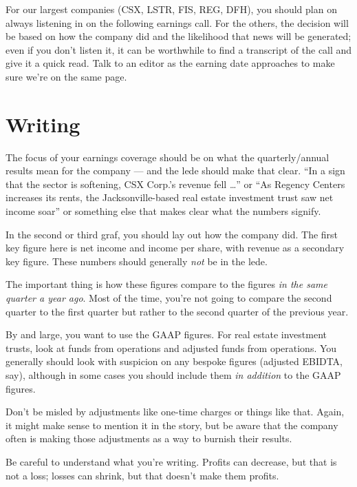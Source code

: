 \documentclass[
  11pt,
  american,
  letterpaperpaper,
  extrafontsizes,onecolumn,openright
  ]{memoir}
\begin{document}
For our largest companies (CSX, LSTR, FIS, REG, DFH), you should plan on always listening in on the following earnings call. For the others, the decision will be based on how the company did and the likelihood that news will be generated; even if you don't listen it, it can be worthwhile to find a transcript of the call and give it a quick read. Talk to an editor as the earning date approaches to make sure we're on the same page.

\hypertarget{writing}{%
\section*{Writing}\label{writing}}

The focus of your earnings coverage should be on what the quarterly/annual results mean for the company --- and the lede should make that clear. \enquote{In a sign that the sector is softening, CSX Corp.'s revenue fell \ldots{}} or \enquote{As Regency Centers increases its rents, the Jacksonville-based real estate investment trust saw net income soar} or something else that makes clear what the numbers signify.

In the second or third graf, you should lay out how the company did. The first key figure here is net income and income per share, with revenue as a secondary key figure. These numbers should generally \emph{not} be in the lede.

The important thing is how these figures compare to the figures \emph{in the same quarter a year ago}. Most of the time, you're not going to compare the second quarter to the first quarter but rather to the second quarter of the previous year.

By and large, you want to use the GAAP figures. For real estate investment trusts, look at funds from operations and adjusted funds from operations. You generally should look with suspicion on any bespoke figures (adjusted EBIDTA, say), although in some cases you should include them \emph{in addition} to the GAAP figures.

Don't be misled by adjustments like one-time charges or things like that. Again, it might make sense to mention it in the story, but be aware that the company often is making those adjustments as a way to burnish their results.

Be careful to understand what you're writing. Profits can decrease, but that is not a loss; losses can shrink, but that doesn't make them profits.
\end{document}
